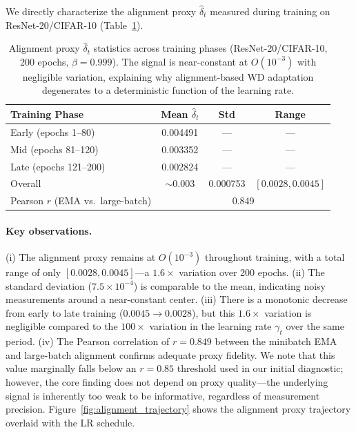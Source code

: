 \documentclass{article}
\begin{document}
We directly characterize the alignment proxy $\hat{\delta}_t$ measured during
training on ResNet-20/CIFAR-10 (Table~\ref{tab:alignment}).

\begin{table}[t]
  \centering
  \caption{Alignment proxy $\hat{\delta}_t$ statistics across training phases
           (ResNet-20/CIFAR-10, 200 epochs, $\beta = 0.999$).
           The signal is near-constant at $O(10^{-3})$ with negligible variation,
           explaining why alignment-based WD adaptation degenerates to a
           deterministic function of the learning rate.}
  \label{tab:alignment}
  \small
  \begin{tabular}{lccc}
    \toprule
    \textbf{Training Phase} & \textbf{Mean $\hat{\delta}_t$} & \textbf{Std}
                            & \textbf{Range} \\
    \midrule
    Early (epochs 1--80)    & 0.004491 & --- & --- \\
    Mid (epochs 81--120)    & 0.003352 & --- & --- \\
    Late (epochs 121--200)  & 0.002824 & --- & --- \\
    \midrule
    Overall & $\sim 0.003$ & 0.000753 & $[0.0028, 0.0045]$ \\
    \midrule
    Pearson $r$ (EMA vs.\ large-batch) & \multicolumn{3}{c}{0.849} \\
    \bottomrule
  \end{tabular}
\end{table}

\paragraph{Key observations.}
(i) The alignment proxy remains at $O(10^{-3})$ throughout training, with a total
range of only $[0.0028, 0.0045]$---a $1.6\times$ variation over 200 epochs.
(ii) The standard deviation ($7.5 \times 10^{-4}$) is comparable to the mean,
indicating noisy measurements around a near-constant center.
(iii) There is a monotonic decrease from early to late training
($0.0045 \to 0.0028$), but this $1.6\times$ variation is negligible compared to the
$100\times$ variation in the learning rate $\gamma_t$ over the same period.
(iv) The Pearson correlation of $r = 0.849$ between the minibatch EMA and large-batch
alignment confirms adequate proxy fidelity.
We note that this value marginally falls below an $r = 0.85$ threshold used in our
initial diagnostic; however, the core finding does not depend on proxy quality---the
underlying signal is inherently too weak to be informative, regardless of measurement
precision.
Figure~\ref{fig:alignment_trajectory} shows the alignment proxy trajectory overlaid
with the LR schedule.
\end{document}
